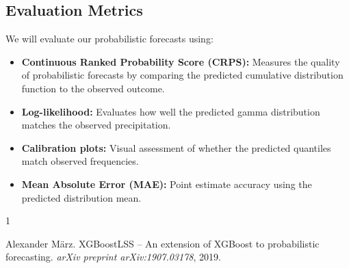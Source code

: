 \documentclass[11pt]{article}
\begin{document}
\subsection{Evaluation Metrics}

We will evaluate our probabilistic forecasts using:
\begin{itemize}
    \item \textbf{Continuous Ranked Probability Score (CRPS):} Measures the quality of probabilistic forecasts by comparing the predicted cumulative distribution function to the observed outcome.
    \item \textbf{Log-likelihood:} Evaluates how well the predicted gamma distribution matches the observed precipitation.
    \item \textbf{Calibration plots:} Visual assessment of whether the predicted quantiles match observed frequencies.
    \item \textbf{Mean Absolute Error (MAE):} Point estimate accuracy using the predicted distribution mean.
\end{itemize}


\begin{thebibliography}{1}

Alexander M{\"a}rz.
\newblock XGBoostLSS -- An extension of XGBoost to probabilistic forecasting.
\newblock \emph{arXiv preprint arXiv:1907.03178}, 2019.

\end{thebibliography}
\end{document}
